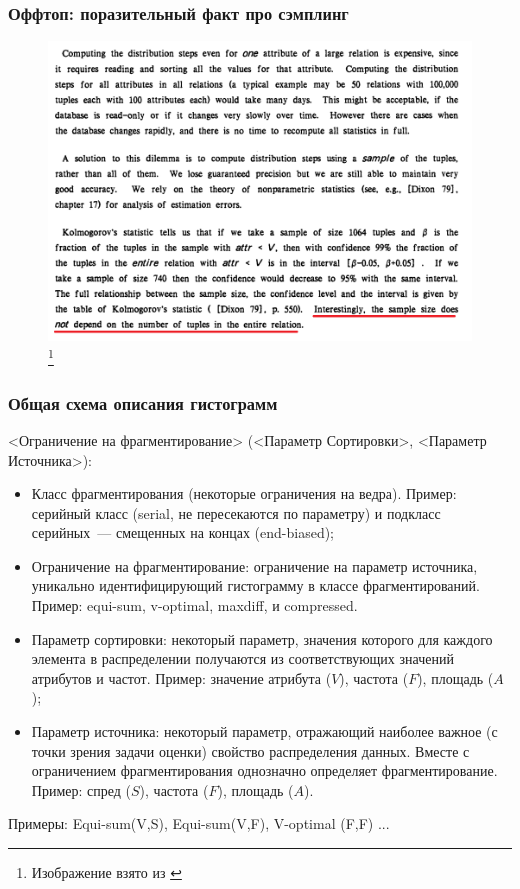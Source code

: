 \documentclass{beamer}
\begin{document}
\begin{frame}
	\frametitle{Оффтоп: поразительный факт про сэмплинг}
	
	\begin{figure}[htb]
		\includegraphics[width=\textwidth,height=0.75\textheight,keepaspectratio]{shapiro-4.png} 
		\footnote{\tiny{Изображение взято из \cite{Piatetsky-Shapiro1984}}}
	\end{figure}
	
\end{frame}

\begin{frame}
\frametitle{Общая схема описания гистограмм}

\scriptsize

<\alert{Ограничение на фрагментирование}> (<\alert{Параметр Сортировки}>, <\alert{Параметр Источника}>):

\begin{itemize}
	\item Класс фрагментирования (некоторые ограничения на ведра). Пример: серийный класс (serial, не пересекаются по параметру) и подкласс серийных~--- смещенных на концах (end-biased);
	\item \alert{Ограничение на фрагментирование}: ограничение на \alert{параметр источника}, уникально идентифицирующий гистограмму в классе фрагментирований. Пример: equi-sum, v-optimal, maxdiff, и compressed.	
	\item \alert{Параметр сортировки}: некоторый параметр, значения которого для каждого элемента в распределении получаются из соответствующих значений атрибутов и частот. Пример: значение атрибута ($V$), частота ($F$), площадь ($A$);
	\item \alert{Параметр источника}: некоторый параметр, отражающий наиболее важное (с точки зрения задачи оценки) свойство распределения данных. Вместе с ограничением фрагментирования однозначно определяет фрагментирование. Пример: спред ($S$), частота ($F$), площадь ($A$).	
\end{itemize}

Примеры: Equi-sum(V,S), Equi-sum(V,F), V-optimal (F,F) ...

\end{frame}
\end{document}
